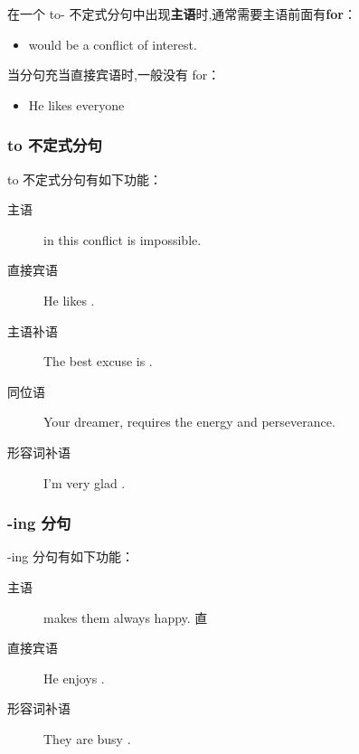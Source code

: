 在一个 to- 不定式分句中出现\textbf{主语}时,通常需要主语前面有\textbf{for}：
\begin{itemize}
\item {} would be a conflict of interest.
\end{itemize}
当分句充当直接宾语时,一般没有 for：
\begin{itemize}
\item He likes everyone 
\end{itemize}

\subsubsection{to 不定式分句}

to 不定式分句有如下功能：
\begin{description}
\item[主语]  in this conflict is impossible.
\item[直接宾语] He likes .
\item[主语补语] The best excuse is .

\item[同位语] Your dreamer,  requires the
  energy and perseverance.

\item[形容词补语] I'm very glad .
\end{description}

\subsubsection{-ing 分句}

-ing 分句有如下功能：
\begin{description}
\item[主语]  makes them always happy.
  直
\item[直接宾语] He enjoys .

\item[形容词补语] They are busy .
\end{description}

